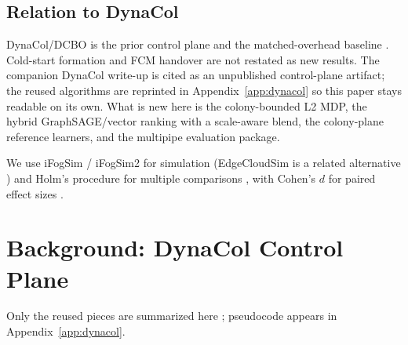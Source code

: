 \documentclass[pdflatex,sn-mathphys-num,iicol]{sn-jnl}
\begin{document}
\subsection{Relation to DynaCol}
DynaCol/DCBO is the prior control plane and the matched-overhead baseline
\cite{nabati_dynacol_cluster2026}. Cold-start formation and FCM handover are
not restated as new results. The companion DynaCol write-up is cited as an
unpublished control-plane artifact; the reused algorithms are reprinted in
Appendix~\ref{app:dynacol} so this paper stays readable on its own. What is new
here is the colony-bounded L2 MDP, the hybrid GraphSAGE/vector ranking with a
scale-aware blend, the colony-plane reference learners, and the multipipe
evaluation package.

\begin{table}[t]
\centering
\caption{Where Dyna-Bound sits relative to common placement families.}
\label{tab:positioning}
\scriptsize
\setlength{\tabcolsep}{3pt}
\end{table}

We use iFogSim / iFogSim2 for simulation
\cite{gupta_ifogsim2017,mahmud_ifogsim2_jss2022}
(EdgeCloudSim is a related alternative \cite{sonmez_edgecloudsim2018})
and Holm's procedure for multiple comparisons \cite{holm_1979}, with Cohen's
$d$ for paired effect sizes \cite{cohen_power1988}.

\section{Background: DynaCol Control Plane}
\label{sec:bg}

Only the reused pieces are summarized here
\cite{nabati_dynacol_cluster2026}; pseudocode appears in
Appendix~\ref{app:dynacol}.
\end{document}
